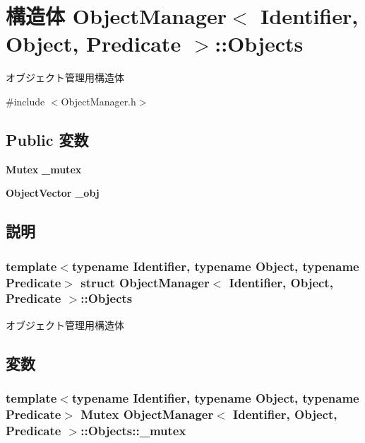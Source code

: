 \section{構造体 ObjectManager$<$ Identifier, Object, Predicate $>$::Objects}
\label{structObjectManager_1_1Objects}


オブジェクト管理用構造体  




{\ttfamily \#include $<$ObjectManager.h$>$}

\subsection*{Public 変数}
\begin{DoxyCompactItemize}
\item 
{\bf Mutex} {\bf \_\-mutex}
\item 
{\bf ObjectVector} {\bf \_\-obj}
\end{DoxyCompactItemize}


\subsection{説明}
\subsubsection*{template$<$typename Identifier, typename Object, typename Predicate$>$ struct ObjectManager$<$ Identifier, Object, Predicate $>$::Objects}

オブジェクト管理用構造体 

\subsection{変数}
\subsubsection[{\_\-mutex}]{\setlength{\rightskip}{0pt plus 5cm}template$<$typename Identifier, typename Object, typename Predicate$>$ {\bf Mutex} {\bf ObjectManager}$<$ Identifier, Object, Predicate $>$::{\bf Objects::\_\-mutex}\hspace{0.3cm}{\ttfamily  [mutable]}}\label{structObjectManager_1_1Objects_a4ba7fb259cc6ebca1a253b366a079f64}


